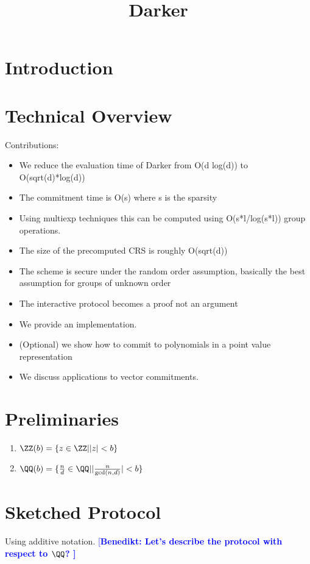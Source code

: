 \documentclass[12pt]{article}
\title{Darker}
\theoremstyle{Definition}
\newcommand{\benedikt}[1]{{\textcolor{blue}{[\bf Benedikt: #1]}}}
\begin{document}
	
\maketitle
\section{Introduction}
\section{Technical Overview}
Contributions:
\begin{itemize}
	\item We reduce the evaluation time of Darker from O(d log(d)) to O(sqrt(d)*log(d))
	\item The commitment time is O(s) where s is the sparsity 
	\item Using multiexp techniques this can be computed using O(s*l/log(s*l)) group operations. 
	\item The size of the precomputed CRS is roughly O(sqrt(d))
	\item The scheme is secure under the random order assumption, basically the best assumption for groups of unknown order
	\item The interactive protocol becomes a proof not an argument
	\item We provide an implementation.
	\item (Optional) we show how to commit to polynomials in a point value representation
	\item We discuss applications to vector commitments. 
\end{itemize}

\section{Preliminaries}
\begin{enumerate}
	\item $\ZZ(b)=\{ z \in \ZZ | |z|<b\}$
	\item $\QQ(b)=\{\frac{n}{d} \in \QQ | |\frac{n}{\gcd(n,d)}|< b\}$
	\end{enumerate}
\section{Sketched Protocol}
Using additive notation. 
\benedikt{Let's describe the protocol with respect to $\QQ$? }
\end{document}
